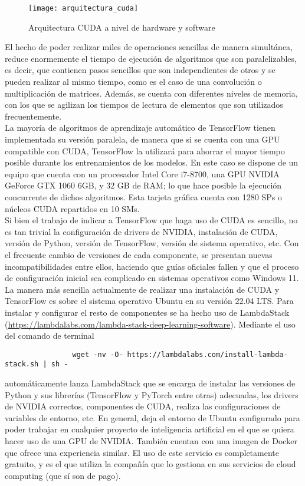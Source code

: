 			\begin{figure}[!h]
				\centering
				\texttt{[image: arquitectura\_cuda]}
				\caption{Arquitectura CUDA a nivel de hardware y software\cite{cuda_arq1}}
				\label{fig:arq_cuda}
			\end{figure}
			
			El hecho de poder realizar miles de operaciones sencillas de manera simultánea, reduce enormemente el tiempo de ejecución de algoritmos que son paralelizables, es decir, que contienen pasos sencillos que son independientes de otros y se pueden realizar al mismo tiempo, como es el caso de una convolución o multiplicación de matrices. Además, se cuenta con diferentes niveles de memoria, con los que se agilizan los tiempos de lectura de elementos que son utilizados frecuentemente. \\
			
			La mayoría de algoritmos de aprendizaje automático de TensorFlow tienen implementada su versión paralela, de manera que si se cuenta con una GPU compatible con CUDA, TensorFlow la utilizará para ahorrar el mayor tiempo posible durante los entrenamientos de los modelos. En este caso se dispone de un equipo que cuenta con un procesador Intel Core i7-8700, una GPU NVIDIA GeForce GTX 1060 6GB, y 32 GB de RAM; lo que hace posible la ejecución concurrente de dichos algoritmos. Esta tarjeta gráfica cuenta con 1280 SPs o núcleos CUDA repartidos en 10 SMs. \\
			
			Si bien el trabajo de indicar a TensorFlow que haga uso de CUDA es sencillo, no es tan trivial la configuración de drivers de NVIDIA, instalación de CUDA, versión de Python, versión de TensorFlow, versión de sistema operativo, etc. Con el frecuente cambio de versiones de cada componente, se presentan nuevas incompatibilidades entre ellos, haciendo que guías oficiales fallen y que el proceso de configuración inicial sea complicado en sistemas operativos como Windows 11. La manera más sencilla actualmente de realizar una instalación de CUDA y TensorFlow es sobre el sistema operativo Ubuntu en su versión 22.04 LTS. Para instalar y configurar el resto de componentes se ha hecho uso de LambdaStack (\url{https://lambdalabs.com/lambda-stack-deep-learning-software}). Mediante el uso del comando de terminal
			\begin{verbatim}
				wget -nv -O- https://lambdalabs.com/install-lambda-stack.sh | sh -
			\end{verbatim}
			automáticamente lanza LambdaStack que se encarga de instalar las versiones de Python y sus librerías (TensorFlow y PyTorch entre otras) adecuadas, los drivers de NVIDIA correctos, componentes de CUDA, realiza las configuraciones de variables de entorno, etc. En general, deja el entorno de Ubuntu configurado para poder trabajar en cualquier proyecto de inteligencia artificial en el que se quiera hacer uso de una GPU de NVIDIA. También cuentan con una imagen de Docker que ofrece una experiencia similar. El uso de este servicio es completamente gratuito, y es el que utiliza la compañía que lo gestiona en sus servicios de cloud computing (que sí son de pago). \\
			
